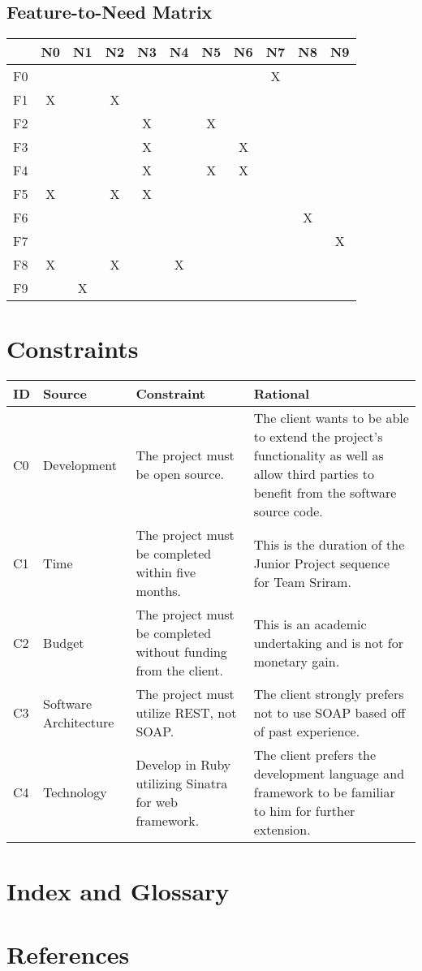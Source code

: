\documentclass{article}
\begin{document}
\subsection{Feature-to-Need Matrix}
\begin{tabular}{ | c || c | c | c | c | c | c | c | c | c | c | }
\hline
   & N0 & N1 & N2 & N3 & N4 & N5 & N6 & N7 & N8 & N9 \\
\hline
\hline
F0 &    &    &    &    &    &    &    & X  &    &    \\
\hline
F1 & X  &    & X  &    &    &    &    &    &    &    \\
\hline
F2 &    &    &    & X  &    & X  &    &    &    &    \\
\hline
F3 &    &    &    & X  &    &    & X  &    &    &    \\
\hline
F4 &    &    &    & X  &    & X  & X  &    &    &    \\
\hline
F5 & X  &    & X  & X  &    &    &    &    &    &    \\
\hline
F6 &    &    &    &    &    &    &    &    & X  &    \\
\hline
F7 &    &    &    &    &    &    &    &    &    & X  \\
\hline
F8 & X  &    & X  &    & X  &    &    &    &    &    \\
\hline
F9 &    & X  &    &    &    &    &    &    &    &    \\
\hline
\end{tabular}

\section{Constraints}
\begin{tabular}{ | p{0.25in} | p{1.15in} | p{2.3in} | p{2.3in} | }
\hline
\textbf{ID} & \textbf{Source} & \textbf{Constraint} & \textbf{Rational}\\
\hline
\hline
C0 & Development & The project must be open source. & The client wants to be able to extend the project's functionality as well as allow third parties to benefit from the software source code.\\
\hline
C1 & Time & The project must be completed within five months. & This is the duration of the Junior Project sequence for Team Sriram.\\
\hline
C2 & Budget & The project must be completed without funding from the client. & This is an academic undertaking and is not for monetary gain.\\
\hline
C3 & Software Architecture & The project must utilize REST, not SOAP. & The client strongly prefers not to use SOAP based off of past experience.\\
\hline
C4 & Technology & Develop in Ruby utilizing Sinatra for web framework. & The client prefers the development language and framework to be familiar to him for further extension.\\
\hline
\end{tabular}

\section{Index and Glossary}

\section{References}
\end{document}
